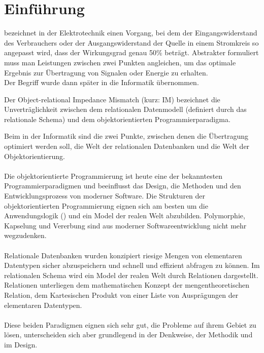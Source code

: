 \chapter{Einführung}

 bezeichnet in der Elektrotechnik einen Vorgang, bei dem der Eingangswiderstand des Verbrauchers oder der Ausgangswiderstand der Quelle in einem Stromkreis so angepasst wird, dass der Wirkungsgrad genau 50\% beträgt. Abstrakter formuliert muss man Leistungen zwischen zwei Punkten angleichen, um das optimale Ergebnis zur Übertragung von Signalen oder Energie zu erhalten. \\
Der Begriff wurde dann später in die Informatik übernommen. 
\begin{definition}
Der Object-relational Impedance Mismatch (kurz: IM) bezeichnet die Unverträglichkeit zwischen dem relationalen Datenmodell (definiert durch das relationale Schema) und dem objektorientierten Programmierparadigma.
\end{definition}
\noindent Beim  in der Informatik sind die zwei Punkte, zwischen denen die Übertragung optimiert werden soll, die Welt der relationalen Datenbanken und die Welt der Objektorientierung. \\
\\
Die objektorientierte Programmierung ist heute eine der bekanntesten Programmierparadigmen und beeinflusst das Design, die Methoden und den Entwicklungsprozess von moderner Software. Die Strukturen der objektorientierten Programmierung eignen sich am besten um die Anwendungslogik () und ein Model der realen Welt abzubilden. Polymorphie, Kapselung und Vererbung sind aus moderner Softwareentwicklung nicht mehr wegzudenken.\\
\\
Relationale Datenbanken wurden konzipiert riesige Mengen von elementaren Datentypen sicher abzuspeichern und schnell und effizient abfragen zu können. Im relationalen Schema wird ein Model der realen Welt durch Relationen dargestellt. Relationen unterliegen dem mathematischen Konzept der mengentheoretischen Relation, dem Kartesischen Produkt von einer Liste von Ausprägungen der elementaren Datentypen.\\
\\
Diese beiden Paradigmen eignen sich sehr gut, die Probleme auf ihrem Gebiet zu lösen, unterscheiden sich aber grundlegend in der Denkweise, der Methodik und im Design.\\
